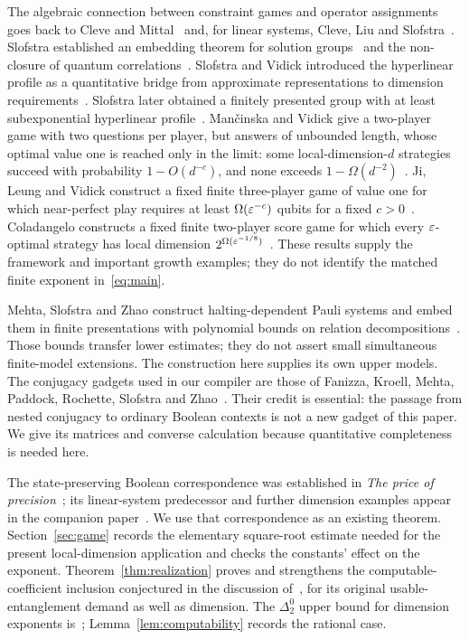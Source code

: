 The algebraic connection between constraint games and operator assignments goes back to Cleve and Mittal~\cite{CM14} and, for linear systems, Cleve, Liu and Slofstra~\cite{CLS17}. Slofstra established an embedding theorem for solution groups~\cite{Slo20} and the non-closure of quantum correlations~\cite{Slo19}. Slofstra and Vidick introduced the hyperlinear profile as a quantitative bridge from approximate representations to dimension requirements~\cite{SV18}. Slofstra later obtained a finitely presented group with at least subexponential hyperlinear profile~\cite{Slo18}. Mančinska and Vidick give a two-player game with two questions per player, but answers of unbounded length, whose optimal value one is reached only in the limit: some local-dimension-$d$ strategies succeed with probability $1-O(d^{-c})$, and none exceeds $1-\Omega(d^{-2})$~\cite{MV15}. Ji, Leung and Vidick construct a fixed finite three-player game of value one for which near-perfect play requires at least $\Omega(\varepsilon^{-c})$ qubits for a fixed $c>0$~\cite{JLV20}. Coladangelo constructs a fixed finite two-player score game for which every $\varepsilon$-optimal strategy has local dimension $2^{\Omega(\varepsilon^{-1/8})}$~\cite{Col20}. These results supply the framework and important growth examples; they do not identify the matched finite exponent in~\eqref{eq:main}.

Mehta, Slofstra and Zhao construct halting-dependent Pauli systems and embed them in finite presentations with polynomial bounds on relation decompositions~\cite[Proposition~4.8]{MSZ23}. Those bounds transfer lower estimates; they do not assert small simultaneous finite-model extensions. The construction here supplies its own upper models. The conjugacy gadgets used in our compiler are those of Fanizza, Kroell, Mehta, Paddock, Rochette, Slofstra and Zhao~\cite[Lemma~5.8 and Theorem~5.5]{FKMPRSZ25}. Their credit is essential: the passage from nested conjugacy to ordinary Boolean contexts is not a new gadget of this paper. We give its matrices and converse calculation because quantitative completeness is needed here.

The state-preserving Boolean correspondence was established in \emph{The price of precision}~\cite[Theorem~4.9]{DM-precision}; its linear-system predecessor and further dimension examples appear in the companion paper~\cite{DM-game}. We use that correspondence as an existing theorem. Section~\ref{sec:game} records the elementary square-root estimate needed for the present local-dimension application and checks the constants' effect on the exponent. Theorem~\ref{thm:realization} proves and strengthens the computable-coefficient inclusion conjectured in the discussion of~\cite[Problem~18.3(i)]{DM-precision}, for its original usable-entanglement demand as well as dimension. The $\Delta^0_2$ upper bound for dimension exponents is~\cite[Proposition~11.13]{DM-precision}; Lemma~\ref{lem:computability} records the rational case.

